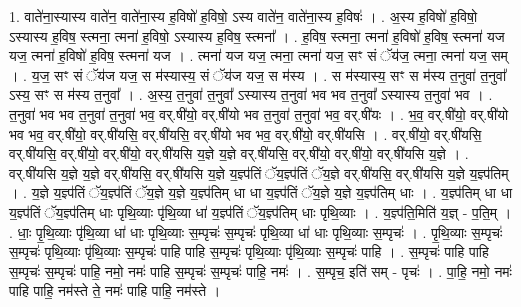 \documentclass[17pt]{extarticle}
\begin{document}
1. वाते॑ना॒स्यास्य वाते॑न॒ वाते॑ना॒स्य ह॒विषो॑ ह॒विषो॒ ऽस्य वाते॑न॒ वाते॑ना॒स्य ह॒विषः॑ । . अ॒स्य ह॒विषो॑ ह॒विषो॒ ऽस्यास्य ह॒विष॒ स्त्मना॒ त्मना॑ ह॒विषो॒ ऽस्यास्य ह॒विष॒ स्त्मना᳚ । . ह॒विष॒ स्त्मना॒ त्मना॑ ह॒विषो॑ ह॒विष॒ स्त्मना॑ यज यज॒ त्मना॑ ह॒विषो॑ ह॒विष॒ स्त्मना॑ यज । . त्मना॑ यज यज॒ त्मना॒ त्मना॑ यज॒ सꣳ सं ॅय॑ज॒ त्मना॒ त्मना॑ यज॒ सम् । . य॒ज॒ सꣳ सं ॅय॑ज यज॒ स म॑स्यास्य॒ सं ॅय॑ज यज॒ स म॑स्य । . स म॑स्यास्य॒ सꣳ स म॑स्य त॒नुवा॑ त॒नुवा᳚ ऽस्य॒ सꣳ स म॑स्य त॒नुवा᳚ । . अ॒स्य॒ त॒नुवा॑ त॒नुवा᳚ ऽस्यास्य त॒नुवा॑ भव भव त॒नुवा᳚ ऽस्यास्य त॒नुवा॑ भव । . त॒नुवा॑ भव भव त॒नुवा॑ त॒नुवा॑ भव॒ वर्.षी॑यो॒ वर्.षी॑यो भव त॒नुवा॑ त॒नुवा॑ भव॒ वर्.षी॑यः । . भ॒व॒ वर्.षी॑यो॒ वर्.षी॑यो भव भव॒ वर्.षी॑यो॒ वर्.षी॑यसि॒ वर्.षी॑यसि॒ वर्.षी॑यो भव भव॒ वर्.षी॑यो॒ वर्.षी॑यसि । . वर्.षी॑यो॒ वर्.षी॑यसि॒ वर्.षी॑यसि॒ वर्.षी॑यो॒ वर्.षी॑यो॒ वर्.षी॑यसि य॒ज्ञे य॒ज्ञे वर्.षी॑यसि॒ वर्.षी॑यो॒ वर्.षी॑यो॒ वर्.षी॑यसि य॒ज्ञे । . वर्.षी॑यसि य॒ज्ञे य॒ज्ञे वर्.षी॑यसि॒ वर्.षी॑यसि य॒ज्ञे य॒ज्ञ्प॑तिं ॅय॒ज्ञ्प॑तिं ॅय॒ज्ञे वर्.षी॑यसि॒ वर्.षी॑यसि य॒ज्ञे य॒ज्ञ्प॑तिम् । . य॒ज्ञे य॒ज्ञ्प॑तिं ॅय॒ज्ञ्प॑तिं ॅय॒ज्ञे य॒ज्ञे य॒ज्ञ्प॑तिम् धा धा य॒ज्ञ्प॑तिं ॅय॒ज्ञे य॒ज्ञे य॒ज्ञ्प॑तिम् धाः । . य॒ज्ञ्प॑तिम् धा धा य॒ज्ञ्प॑तिं ॅय॒ज्ञ्प॑तिम् धाः पृथि॒व्याः पृ॑थि॒व्या धा॑ य॒ज्ञ्प॑तिं ॅय॒ज्ञ्प॑तिम् धाः पृथि॒व्याः । . य॒ज्ञ्प॑ति॒मिति॑ य॒ज्ञ् - प॒ति॒म् । . धाः॒ पृ॒थि॒व्याः पृ॑थि॒व्या धा॑ धाः पृथि॒व्याः स॒म्पृचः॑ स॒म्पृचः॑ पृथि॒व्या धा॑ धाः पृथि॒व्याः स॒म्पृचः॑ । . पृ॒थि॒व्याः स॒म्पृचः॑ स॒म्पृचः॑ पृथि॒व्याः पृ॑थि॒व्याः स॒म्पृचः॑ पाहि पाहि स॒म्पृचः॑ पृथि॒व्याः पृ॑थि॒व्याः स॒म्पृचः॑ पाहि । . स॒म्पृचः॑ पाहि पाहि स॒म्पृचः॑ स॒म्पृचः॑ पाहि॒ नमो॒ नमः॑ पाहि स॒म्पृचः॑ स॒म्पृचः॑ पाहि॒ नमः॑ । . स॒म्पृच॒ इति॑ सम् - पृचः॑ । . पा॒हि॒ नमो॒ नमः॑ पाहि पाहि॒ नम॑स्ते ते॒ नमः॑ पाहि पाहि॒ नम॑स्ते । \newline
\end{document}
